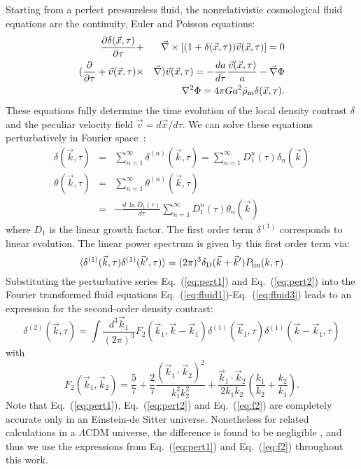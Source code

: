 \documentclass[prd,amsmath,amssymb,floatfix,superscriptaddress,nofootinbib,twocolumn]{revtex4-1}
\def\be{\begin{equation}}
\def\ee{\end{equation}}
\def\bea{\begin{eqnarray}}
\def\eea{\end{eqnarray}}
\newcommand{\vs}{\nonumber\\}
\newcommand{\vk}{\vec{k}}
\newcommand{\ec}[1]{Eq.~(\ref{eq:#1})}
\newcommand{\eql}[1]{\label{eq:#1}}
\newcommand{\peikai}[1]{{\color{blue} #1}}
\newcommand{\RC}[1]{{\color{darkorange} #1}}
\begin{document}
\label{sec1}
Starting from a perfect pressureless fluid, the nonrelativistic cosmological fluid equations are the continuity, Euler and Poisson equations:
\bea
\frac{\partial \delta(\vec{x},\tau)}{\partial \tau} &+&\vec{\nabla}\times [(1+\delta(\vec{x},\tau))\vec{v}(\vec{x},\tau)] =0\eql{fluid1} \\
(\frac{\partial}{\partial \tau} +\vec{v}(\vec{x},\tau)&\times&\vec{\nabla})\vec{v}(\vec{x},\tau)=-\frac{da}{d\tau}\frac{\vec{v}(\vec{x},\tau)}{a}-\vec{\nabla}\Phi \eql{eulereq}\\
&&\nabla^2 \Phi = 4\pi G a^2 \bar{\rho}_{\rm m} \delta(\vec{x},\tau) .\eql{fluid3}
\eea
These equations fully determine the time evolution of the local density contrast $\delta$ and the peculiar velocity field $\vec{v}=d\vec{x}/d\tau$.
We can solve these equations perturbatively in Fourier space~\cite{Bernardeau:2002rev}:
\bea
{\delta}(\vk,\tau) &=&\sum_{n=1}^{\infty} {\delta}^{(n)}(\vk,\tau)=\sum_{n=1}^{\infty}D_1^{n}(\tau)\delta_{n}(\vk)  \eql{pert1}\\
{\theta}(\vk,\tau)&=&\sum_{n=1}^{\infty}{\theta}^{(n)}(\vk,\tau) \vs
&=&-\frac{d\,\ln D_1(\tau)}{d\tau}\sum_{n=1}^{\infty}D_1^{n}(\tau)\theta_{n}(\vk) \eql{pert2}
\eea
where $D_1$ is the linear growth factor. %
The first order term ${\delta}^{(1)}$ corresponds to linear evolution. The linear power spectrum is given by this first order term via:
\be 
\langle {\delta^{(1)}}(\vk,\tau){\delta^{(1)}}(\vk',\tau) \rangle =(2\pi)^3 \delta_{\rm D}(\vk+\vk')P_{\rm lin}(k,\tau) \eql{lin}
\ee 
Substituting the perturbative series \ec{pert1} and \ec{pert2} into the Fourier transformed fluid equations \ec{fluid1}-\ec{fluid3} leads to an expression for the second-order density contrast:
\be
{\delta}^{(2)}(\vk,\tau)=\int \frac{d^{3}\vk_{1}}{(2\pi)^3} F_2(\vk_1,\vk-\vk_1){\delta}^{(1)}(\vk_1,\tau) {\delta}^{(1)}(\vk-\vk_1,\tau) \eql{sorder} 
\ee
with 
\be
F_{2}(\vk_1,\vk_2)=\frac{5}{7}+\frac{2}{7}\frac{(\vk_1\cdot \vk_2)^2}{k_1^2 k_2^2}+\frac{\vk_1\cdot \vk_2}{2k_1k_2}(\frac{k_1}{k_2}+\frac{k_2}{k_1}).\eql{f2}
\ee
Note that \ec{pert1}, \ec{pert2} and \ec{f2} are completely accurate only in an Einstein-de Sitter universe. Nonetheless for related calculations in a $\Lambda$CDM universe, the difference is found to be negligible \cite{Takahashi:2008to}, and thus we use the expressions from \ec{pert1} and \ec{f2} throughout this work.\\
\end{document}
